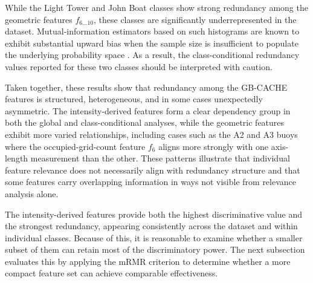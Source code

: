 \documentclass{erauthesis}
\begin{document}
While the Light Tower and John Boat classes show strong redundancy among the geometric features $f_{6...10}$, these classes are significantly underrepresented in the dataset. Mutual-information estimators based on such histograms are known to exhibit substantial upward bias when the sample size is insufficient to populate the underlying probability space \cite{paninski2003}. As a result, the class-conditional redundancy values reported for these two classes should be interpreted with caution.

Taken together, these results show that redundancy among the GB-CACHE features is structured, heterogeneous, and in some cases unexpectedly asymmetric. The intensity-derived features form a clear dependency group in both the global and class-conditional analyses, while the geometric features exhibit more varied relationships, including cases such as the A2 and A3 buoys where the occupied-grid-count feature $f_6$ aligns more strongly with one axis-length measurement than the other. These patterns illustrate that individual feature relevance does not necessarily align with redundancy structure and that some features carry overlapping information in ways not visible from relevance analysis alone.

The intensity-derived features provide both the highest discriminative value and the strongest redundancy, appearing consistently across the dataset and within individual classes. Because of this, it is reasonable to examine whether a smaller subset of them can retain most of the discriminatory power. The next subsection evaluates this by applying the \ac{mRMR} criterion to determine whether a more compact feature set can achieve comparable effectiveness.


\end{document}

